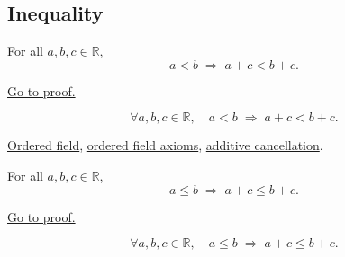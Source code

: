 
\subsection*{Inequality}
\label{sec:inequality}

\begin{theorem}
\label{thm:ineq-add-both-sides}
For all $a, b, c \in \mathbb{R}$,
\[
  a < b \;\Rightarrow\; a + c < b + c.
\]
\end{theorem}



\begin{remark*}[Proof]
\hyperref[prf:ineq-add-both-sides]{Go to proof.}
\end{remark*}

\begin{remark*}
\[
  \forall a, b, c \in \mathbb{R},\quad
  a < b \;\Rightarrow\; a + c < b + c.
\]
\end{remark*}

\begin{dependencies}
\hyperref[def:real-ordered-field]{Ordered field},
\hyperref[thm:q-is-an-ordered-field]{ordered field axioms},
\hyperref[cor:additive-cancellation-on-q]{additive cancellation}.
\end{dependencies}


\begin{theorem}
\label{thm:ineq-nonstrict-add-both-sides}
For all $a, b, c \in \mathbb{R}$,
\[
  a \le b \;\Rightarrow\; a + c \le b + c.
\]
\end{theorem}



\begin{remark*}[Proof]
\hyperref[prf:ineq-nonstrict-add-both-sides]{Go to proof.}
\end{remark*}

\begin{remark*}
\[
  \forall a, b, c \in \mathbb{R},\quad
  a \le b \;\Rightarrow\; a + c \le b + c.
\]
\end{remark*}

